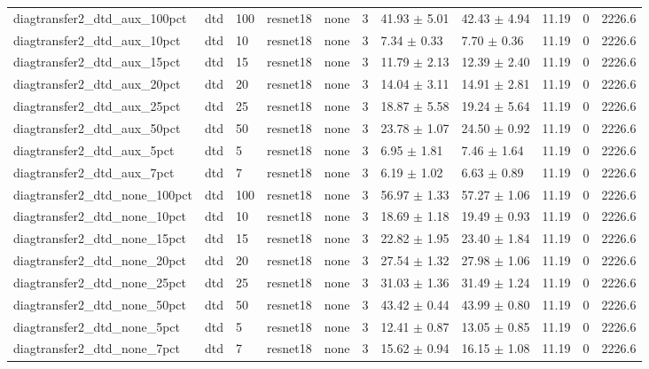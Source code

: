 \begin{tabular}{lllllllllll}
diagtransfer2_dtd_aux_100pct & dtd & 100 & resnet18 & none & 3 & 41.93 $\pm$ 5.01 & 42.43 $\pm$ 4.94 & 11.19 & 0 & 2226.6 \\
diagtransfer2_dtd_aux_10pct & dtd & 10 & resnet18 & none & 3 & 7.34 $\pm$ 0.33 & 7.70 $\pm$ 0.36 & 11.19 & 0 & 2226.6 \\
diagtransfer2_dtd_aux_15pct & dtd & 15 & resnet18 & none & 3 & 11.79 $\pm$ 2.13 & 12.39 $\pm$ 2.40 & 11.19 & 0 & 2226.6 \\
diagtransfer2_dtd_aux_20pct & dtd & 20 & resnet18 & none & 3 & 14.04 $\pm$ 3.11 & 14.91 $\pm$ 2.81 & 11.19 & 0 & 2226.6 \\
diagtransfer2_dtd_aux_25pct & dtd & 25 & resnet18 & none & 3 & 18.87 $\pm$ 5.58 & 19.24 $\pm$ 5.64 & 11.19 & 0 & 2226.6 \\
diagtransfer2_dtd_aux_50pct & dtd & 50 & resnet18 & none & 3 & 23.78 $\pm$ 1.07 & 24.50 $\pm$ 0.92 & 11.19 & 0 & 2226.6 \\
diagtransfer2_dtd_aux_5pct & dtd & 5 & resnet18 & none & 3 & 6.95 $\pm$ 1.81 & 7.46 $\pm$ 1.64 & 11.19 & 0 & 2226.6 \\
diagtransfer2_dtd_aux_7pct & dtd & 7 & resnet18 & none & 3 & 6.19 $\pm$ 1.02 & 6.63 $\pm$ 0.89 & 11.19 & 0 & 2226.6 \\
diagtransfer2_dtd_none_100pct & dtd & 100 & resnet18 & none & 3 & 56.97 $\pm$ 1.33 & 57.27 $\pm$ 1.06 & 11.19 & 0 & 2226.6 \\
diagtransfer2_dtd_none_10pct & dtd & 10 & resnet18 & none & 3 & 18.69 $\pm$ 1.18 & 19.49 $\pm$ 0.93 & 11.19 & 0 & 2226.6 \\
diagtransfer2_dtd_none_15pct & dtd & 15 & resnet18 & none & 3 & 22.82 $\pm$ 1.95 & 23.40 $\pm$ 1.84 & 11.19 & 0 & 2226.6 \\
diagtransfer2_dtd_none_20pct & dtd & 20 & resnet18 & none & 3 & 27.54 $\pm$ 1.32 & 27.98 $\pm$ 1.06 & 11.19 & 0 & 2226.6 \\
diagtransfer2_dtd_none_25pct & dtd & 25 & resnet18 & none & 3 & 31.03 $\pm$ 1.36 & 31.49 $\pm$ 1.24 & 11.19 & 0 & 2226.6 \\
diagtransfer2_dtd_none_50pct & dtd & 50 & resnet18 & none & 3 & 43.42 $\pm$ 0.44 & 43.99 $\pm$ 0.80 & 11.19 & 0 & 2226.6 \\
diagtransfer2_dtd_none_5pct & dtd & 5 & resnet18 & none & 3 & 12.41 $\pm$ 0.87 & 13.05 $\pm$ 0.85 & 11.19 & 0 & 2226.6 \\
diagtransfer2_dtd_none_7pct & dtd & 7 & resnet18 & none & 3 & 15.62 $\pm$ 0.94 & 16.15 $\pm$ 1.08 & 11.19 & 0 & 2226.6 \\

\end{tabular}
